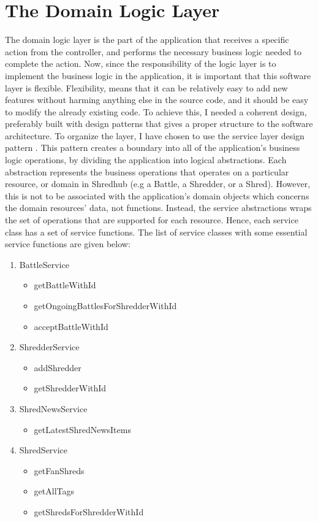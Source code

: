 \section{The Domain Logic Layer}
The domain logic layer is the part of the application that receives a specific action from the controller, and performs the necessary business logic needed to complete the action. Now, since the responsibility of the logic layer is to implement the business logic in the application, it is important that this software layer is flexible. Flexibility, means that it can be relatively easy to add new features without harming anything else in the source code, and it should be easy to modify the already existing code. To achieve this, I needed a coherent design, preferably built with design patterns that gives a proper structure to the software architecture. To organize the layer, I have chosen to use the service layer design pattern \cite{poea}. This pattern creates a boundary into all of the application's business logic operations, by dividing the application into logical abstractions. Each abstraction represents the business operations that operates on a particular resource, or domain in Shredhub (e.g a Battle, a Shredder, or a Shred). However, this is not to be associated with the application's domain objects which concerns the domain resources' data, not functions. Instead, the service abstractions wraps the set of operations that are supported for each resource. Hence, each service class has a set of service functions. The list of service classes with some essential service functions are given below:
		\begin{enumerate}
			\item{} BattleService 
				\begin{itemize}
					\item{} getBattleWithId
					\item{} getOngoingBattlesForShredderWithId
					\item{} acceptBattleWithId
				\end{itemize}
			\item{} ShredderService
				\begin{itemize}
					\item{} addShredder
					\item{} getShredderWithId
				\end{itemize}	
			\item{} ShredNewsService
				\begin{itemize}
					\item{}getLatestShredNewsItems
				\end{itemize}
			\item{} ShredService
				\begin{itemize}
					\item{} getFanShreds
					\item{} getAllTags
					\item{} getShredsForShredderWithId
				\end{itemize}
		\end{enumerate}

